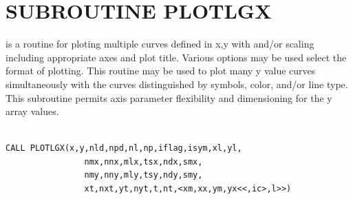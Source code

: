 \documentclass[11pt]{report}
\begin{document}
\newpage
\section{SUBROUTINE PLOTLGX}

 is a routine for
ploting multiple curves defined in x,y with  and/or 
scaling including appropriate axes and plot title.  Various options
may be used select the format of plotting.  This routine may be used
to plot many y value curves simultaneously with the curves distinguished
by symbols, color, and/or line type.  This subroutine permits axis
parameter flexibility and dimensioning for the y array values.
\begin{verbatim}

CALL PLOTLGX(x,y,nld,npd,nl,np,iflag,isym,xl,yl,
                nmx,nnx,mlx,tsx,ndx,smx,
                nmy,nny,mly,tsy,ndy,smy,
                xt,nxt,yt,nyt,t,nt,<xm,xx,ym,yx<<,ic>,l>>)


\end{verbatim}
\end{document}
